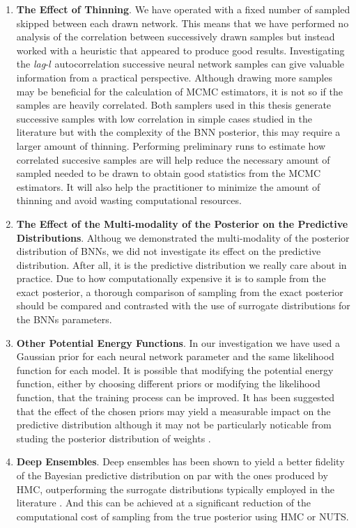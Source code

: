 \begin{enumerate}
    \item \textbf{The Effect of Thinning}. We have operated with a fixed number of sampled skipped between each drawn network. This means that we have performed no analysis of the correlation between successively drawn samples but instead worked with a heuristic that appeared to produce good results. Investigating the \textit{lag}-$l$ autocorrelation successive neural network samples can give valuable information from a practical perspective. Although drawing more samples may be beneficial for the calculation of MCMC estimators, it is not so if the samples are heavily correlated. Both samplers used in this thesis generate successive samples with low correlation in simple cases studied in the literature \cite{nuts,neal2011} but with the complexity of the BNN posterior, this may require a larger amount of thinning. Performing preliminary runs to estimate how correlated succesive samples are will help reduce the necessary amount of sampled needed to be drawn to obtain good statistics from the MCMC estimators. It will also help the practitioner to minimize the amount of thinning and avoid wasting computational resources.
    \item \textbf{The Effect of the Multi-modality of the Posterior on the Predictive Distributions}. Althoug we demonstrated the multi-modality of the posterior distribution of BNNs, we did not investigate its effect on the predictive distribution. After all, it is the predictive distribution we really care about in practice. Due to how computationally expensive it is to sample from the exact posterior, a thorough comparison of sampling from the exact posterior should be compared and contrasted with the use of surrogate distributions for the BNNs parameters. 
    \item \textbf{Other Potential Energy Functions}. In our investigation we have used a Gaussian prior for each neural network parameter and the same likelihood function for each model. It is possible that modifying the potential energy function, either by choosing different priors or modifying the likelihood function, that the training process can be improved. It has been suggested that the effect of the chosen priors may yield a measurable impact on the predictive distribution although it may not be particularly noticable from studing the posterior distribution of weights \cite{google_bnn_posteriors}.
    \item \textbf{Deep Ensembles}. Deep ensembles has been shown to yield a better fidelity of the Bayesian predictive distribution on par with the ones produced by HMC, outperforming the surrogate distributions typically employed in the literature \cite{google_bnn_posteriors}. And this can be achieved at a significant reduction of the computational cost of sampling from the true posterior using HMC or NUTS.

\end{enumerate}
